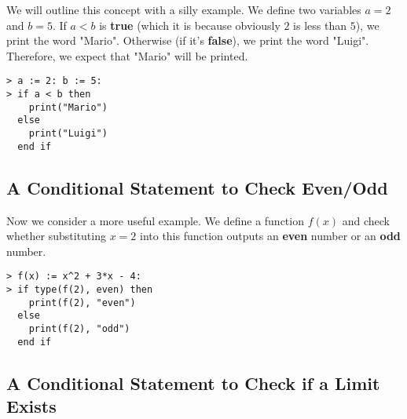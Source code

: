 We will outline this concept with a silly example. We define two variables $a=2$ and $b=5$. If $a<b$ is \textbf{true} (which it is because obviously $2$ is less than $5$), we print the word "Mario". Otherwise (if it's \textbf{false}), we print the word "Luigi". Therefore, we expect that "Mario" will be printed.
\begin{maplegroup}
\begin{mapleinput}
\begin{verbatim}
> a := 2: b := 5:
> if a < b then
    print("Mario")
  else
    print("Luigi")
  end if
\end{verbatim}
\end{mapleinput}
\mapleresult
\begin{maplelatex}
\end{maplelatex}
\end{maplegroup}

\subsection{A Conditional Statement to Check Even/Odd}

Now we consider a more useful example. We define a function $f(x)$ and check whether substituting $x=2$ into this function outputs an \textbf{even} number or an \textbf{odd} number. 

\begin{maplegroup}
\begin{mapleinput}
\begin{verbatim}
> f(x) := x^2 + 3*x - 4:
> if type(f(2), even) then
    print(f(2), "even")
  else
    print(f(2), "odd")
  end if
\end{verbatim}
\end{mapleinput}
\mapleresult
\begin{maplelatex}
\end{maplelatex}
\end{maplegroup}

\subsection{A Conditional Statement to Check if a Limit Exists}

